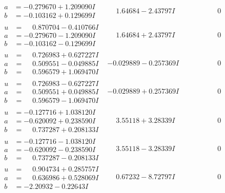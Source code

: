 \documentclass[1p]{elsarticle_modified}
\theoremstyle{definition}
\begin{document}
$$\begin{array}{c|c|c}
\begin{aligned}
a &= -0.279670 + 1.209090 I \\
b &= -0.103162 + 0.129699 I\end{aligned}
 & \phantom{-}1.64684 - 2.43797 I & \phantom{-0.000000 } 0 \\ \hline\begin{aligned}
u &= \phantom{-}0.870704 - 0.410766 I \\
a &= -0.279670 - 1.209090 I \\
b &= -0.103162 - 0.129699 I\end{aligned}
 & \phantom{-}1.64684 + 2.43797 I & \phantom{-0.000000 } 0 \\ \hline\begin{aligned}
u &= \phantom{-}0.726983 + 0.627227 I \\
a &= \phantom{-}0.509551 - 0.049885 I \\
b &= \phantom{-}0.596579 + 1.069470 I\end{aligned}
 & -0.029889 - 0.257369 I & \phantom{-0.000000 } 0 \\ \hline\begin{aligned}
u &= \phantom{-}0.726983 - 0.627227 I \\
a &= \phantom{-}0.509551 + 0.049885 I \\
b &= \phantom{-}0.596579 - 1.069470 I\end{aligned}
 & -0.029889 + 0.257369 I & \phantom{-0.000000 } 0 \\ \hline\begin{aligned}
u &= -0.127716 + 1.038120 I \\
a &= -0.620092 + 0.238590 I \\
b &= \phantom{-}0.737287 + 0.208133 I\end{aligned}
 & \phantom{-}3.55118 + 3.28339 I & \phantom{-0.000000 } 0 \\ \hline\begin{aligned}
u &= -0.127716 - 1.038120 I \\
a &= -0.620092 - 0.238590 I \\
b &= \phantom{-}0.737287 - 0.208133 I\end{aligned}
 & \phantom{-}3.55118 - 3.28339 I & \phantom{-0.000000 } 0 \\ \hline\begin{aligned}
u &= \phantom{-}0.904734 + 0.285757 I \\
a &= \phantom{-}0.636986 + 0.528069 I \\
b &= -2.20932 - 0.22643 I\end{aligned}
 & \phantom{-}0.67232 - 8.72797 I & \phantom{-0.000000 } 0 \\ \hline\begin{aligned}

\end{aligned}
\end{array}$$
\end{document}
